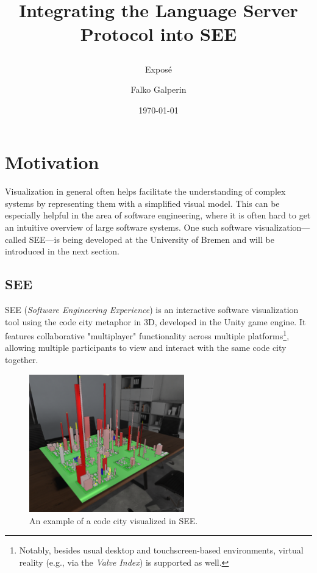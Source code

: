 \documentclass{scrartcl}
\newif\ifdraft
\newcommand{\SEE}{\textsc{SEE}}
\begin{document}
\title{
  Integrating the Language Server Protocol into SEE
  \ifdraft
    -- \emph{DRAFT} --
  \fi
}
\subtitle{Exposé}
\author{Falko Galperin}
\date{\today} 

\maketitle

\begingroup
  \tableofcontents
\endgroup
\newpage

\section{Motivation}
Visualization in general often helps facilitate the understanding of complex systems by representing them with a simplified visual model.
This can be especially helpful in the area of software engineering, where it is often hard to get an intuitive overview of large software systems.
One such software visualization---called \SEE{}---is being developed at the University of Bremen and will be introduced in the next section.


\subsection{SEE}
\SEE{} (\emph{Software Engineering Experience}) is an interactive software visualization tool using the code city metaphor in 3D, developed in the {Unity} game engine.
It features collaborative "multiplayer" functionality across multiple platforms\footnote{
  Notably, besides usual desktop and touchscreen-based environments, virtual reality (e.g., via the \emph{Valve Index}) is supported as well.
}, allowing multiple participants to view and interact with the same code city together.

\begin{figure}
    \centering
    \includegraphics[width=0.6\textwidth]{figures/SEE_city}
    \caption{An example of a code city visualized in \SEE{}.}\label{fig:city}
\end{figure}
\end{document}
